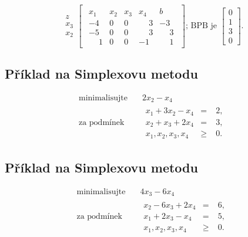 \begin{equation*}
    \begin{array}{c}
        \\
        z \\
        x_3 \\
        x_2 \\
    \end{array}
    \begin{bmatrix}
        \begin{array}{cccc|c}
            x_1 & x_2 & x_3 & x_4 & b \\ \hline
            -4 & 0 & 0 & \phantom{-}3 & -3 \\ \hline
            -5 & 0 & 0 & \phantom{-}3 & \phantom{-}3  \\
            \phantom{-}1 & 0 & 0 & -1 & \phantom{-}1
        \end{array}
    \end{bmatrix}
    \text{; BPB je }
    \begin{bmatrix}
        0 \\
        1 \\
        3 \\
        0
    \end{bmatrix}.
\end{equation*}

\subsection{Příklad na Simplexovu metodu}
\[
\begin{aligned}
\text{minimalisujte}\quad &2x_2 - x_4\\
\text{za podmínek}\quad&
  \begin{alignedat}{2}
    x_1 + 3x_2 - x_4 &=&\;2,\\
    x_2 + x_3 + 2x_4 &=&\;3,\\
    x_1,x_2,x_3,x_4&\ge&\;0.
   \end{alignedat}
\end{aligned}
\]

\subsection{Příklad na Simplexovu metodu}
\[
\begin{aligned}
\text{minimalisujte}\quad &4x_3 - 6x_4\\
\text{za podmínek}\quad&
  \begin{alignedat}{2}
    x_2 - 6x_3 + 2x_4 &=&\;6,\\
    x_1 + 2x_3 - x_4  &=&\;5,\\
    x_1,x_2,x_3,x_4&\ge&\;0.
   \end{alignedat}
\end{aligned}
\]

